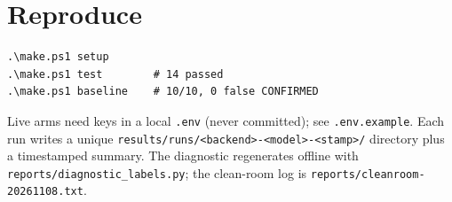 \documentclass[11pt,a4paper]{article}
\begin{document}
\section{Reproduce}

\begin{verbatim}
.\make.ps1 setup
.\make.ps1 test        # 14 passed
.\make.ps1 baseline    # 10/10, 0 false CONFIRMED
\end{verbatim}

Live arms need keys in a local \texttt{.env} (never committed); see
\texttt{.env.example}. Each run writes a unique
\texttt{results/runs/<backend>-<model>-<stamp>/} directory plus a timestamped
summary. The diagnostic regenerates offline with
\texttt{reports/diagnostic\_labels.py}; the clean-room log is
\texttt{reports/cleanroom-20261108.txt}.
\end{document}

